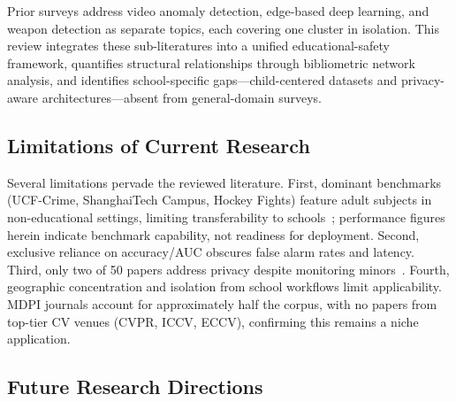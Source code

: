 \documentclass[conference]{IEEEtran}
\begin{document}
Prior surveys address video anomaly detection, edge-based deep learning, and weapon detection as separate topics, each covering one cluster in isolation. This review integrates these sub-literatures into a unified educational-safety framework, quantifies structural relationships through bibliometric network analysis, and identifies school-specific gaps---child-centered datasets and privacy-aware architectures---absent from general-domain surveys.

\subsection{Limitations of Current Research}

Several limitations pervade the reviewed literature. First, dominant benchmarks (UCF-Crime, ShanghaiTech Campus, Hockey Fights) feature adult subjects in non-educational settings, limiting transferability to schools~\cite{b15}; performance figures herein indicate benchmark capability, not readiness for deployment. Second, exclusive reliance on accuracy/AUC obscures false alarm rates and latency. Third, only two of 50 papers address privacy despite monitoring minors~\cite{b11}. Fourth, geographic concentration and isolation from school workflows limit applicability. MDPI journals account for approximately half the corpus, with no papers from top-tier CV venues (CVPR, ICCV, ECCV), confirming this remains a niche application.

\subsection{Future Research Directions}
\end{document}
